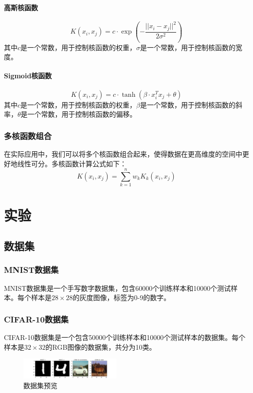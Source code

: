 \documentclass[a4paper]{article}
\begin{document}
\paragraph*{高斯核函数}
\[K(x_i, x_j) = c\cdot \exp\left(-\frac{||x_i - x_j||^2}{2\sigma^2}\right)\]
其中$c$是一个常数，用于控制核函数的权重，$\sigma$是一个常数，用于控制核函数的宽度。

\paragraph*{Sigmoid核函数}
\[K(x_i, x_j) = c\cdot \tanh(\beta \cdot x_i^Tx_j + \theta)\]
其中$c$是一个常数，用于控制核函数的权重，$\beta$是一个常数，用于控制核函数的斜率，$\theta$是一个常数，用于控制核函数的偏移。

\subsubsection{多核函数组合}
在实际应用中，我们可以将多个核函数组合起来，使得数据在更高维度的空间中更好地线性可分。多核函数计算公式如下：
\[K(x_i, x_j) = \sum_{k=1}^{n}w_kK_k(x_i, x_j)\]

\section{实验}
\subsection{数据集}
\subsubsection{MNIST数据集}
MNIST数据集是一个手写数字数据集，包含60000个训练样本和10000个测试样本。每个样本是$28\times28$的灰度图像，标签为0-9的数字。
\subsubsection{CIFAR-10数据集}
CIFAR-10数据集是一个包含50000个训练样本和10000个测试样本的数据集。每个样本是$32\times32$的RGB图像的数据集，共分为10类。
\begin{figure}[H]
    \centering
    \includegraphics[width=0.45\textwidth]{pictures/dataset.png}
    \caption{数据集预览}
\end{figure}
\end{document}
